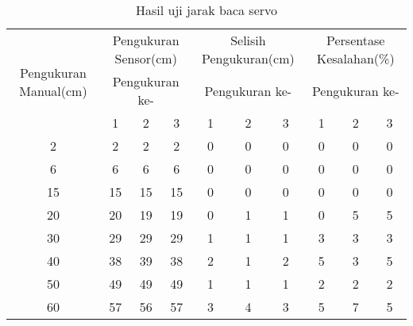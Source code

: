 \documentclass[11pt]{article}
\begin{document}
 
\begin{table} 
    \caption{Hasil uji jarak baca servo}
    \label{table:tableUjiServo}
    \begin{tabular}{|c|c|c|c|c|c|c|c|c|c|}
    \hline
    \multirow{3}{2cm}{Pengukuran Manual(cm)} & \multicolumn{3}{c|}{Pengukuran Sensor(cm)} & \multicolumn{3}{c|}{Selisih Pengukuran(cm)} & \multicolumn{3}{c|}{Persentase Kesalahan(\%)} \\ \cline{2-10} 
                                       & \multicolumn{3}{c|}{Pengukuran ke-}         & \multicolumn{3}{c|}{Pengukuran ke-}          & \multicolumn{3}{c|}{Pengukuran ke-}       \\ \cline{2-10} 
                                       & 1             & 2            & 3            & 1             & 2             & 3            & 1            & 2            & 3           \\ \hline
    2                                  & 2             & 2            & 2            & 0             & 0             & 0            & 0            & 0            & 0           \\ \hline
    6                                  & 6             & 6            & 6            & 0             & 0             & 0            & 0            & 0            & 0           \\ \hline
    15                                 & 15            & 15           & 15           & 0             & 0             & 0            & 0            & 0            & 0           \\ \hline
    20                                 & 20            & 19           & 19           & 0             & 1             & 1            & 0            & 5            & 5           \\ \hline
    30                                 & 29            & 29           & 29           & 1             & 1             & 1            & 3            & 3            & 3           \\ \hline
    40                                 & 38            & 39           & 38           & 2             & 1             & 2            & 5            & 3            & 5           \\ \hline
    50                                 & 49            & 49           & 49           & 1             & 1             & 1            & 2            & 2            & 2           \\ \hline
    60                                 & 57            & 56           & 57           & 3             & 4             & 3            & 5            & 7            & 5           \\ \hline

\end{tabular}
\end{table}
\end{document}

